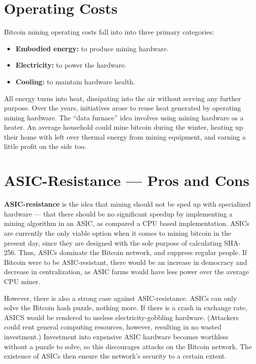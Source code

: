 \documentclass[full.tex]{subfiles}
\begin{document}
    \section*{Operating Costs}
    
     \noindent Bitcoin mining operating costs fall into into three primary categories:
     \begin{itemize}
        \item \textbf{Embodied energy:} to produce mining hardware. 
        \item \textbf{Electricity:} to power the hardware. 
        \item \textbf{Cooling:} to maintain hardware health. 
    \end{itemize}
    
    All energy turns into heat, dissipating into the air without serving any further purpose. Over the years, initiatives arose to reuse heat generated by operating mining hardware. The ``data furnace'' idea involves using mining hardware as a heater. An average household could mine bitcoin during the winter, heating up their home with left over thermal energy from mining equipment, and earning a little profit on the side too. 
    
    \section*{ASIC-Resistance --- Pros and Cons}
    
    \textbf{ASIC-resistance} is the idea that mining should not be sped up with specialized hardware --- that there should be no significant speedup by implementing a mining algorithm in an ASIC, as compared a CPU based implementation. ASICs are currently the only viable option when it comes to mining bitcoin in the present day, since they are designed with the sole purpose of calculating SHA-256. Thus, ASICs dominate the Bitcoin network, and suppress regular people. If Bitcoin were to be ASIC-resistant, there would be an increase in democracy and decrease in centralization, as ASIC farms would have less power over the average CPU miner.
    
    However, there is also a strong case against ASIC-resistance. ASICs can only solve the Bitcoin hash puzzle, nothing more. If there is a crash in exchange rate, ASICS would be rendered to useless electricity-gobbling hardware. (Attackers could rent general computing resources, however, resulting in no wasted investment.) Investment into expensive ASIC hardware becomes worthless without a puzzle to solve, so this discourages attacks on the Bitcoin network. The existence of ASICs then ensure the network's security to a certain extent.
    
\end{document}
